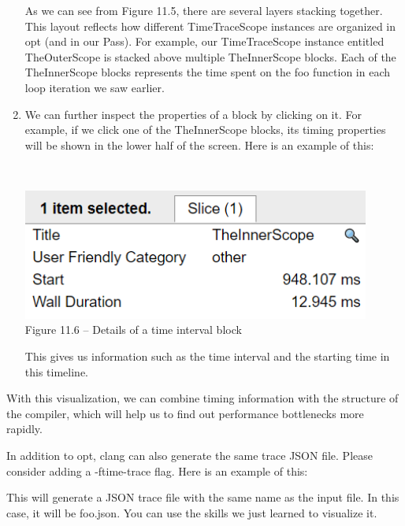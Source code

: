 \begin{enumerate}
As we can see from Figure 11.5, there are several layers stacking together. This layout reflects how different TimeTraceScope instances are organized in opt (and in our Pass). For example, our TimeTraceScope instance entitled TheOuterScope is stacked above multiple TheInnerScope blocks. Each of the TheInnerScope blocks represents the time spent on the foo function in each loop iteration we saw earlier.

\item We can further inspect the properties of a block by clicking on it. For example, if we click one of the TheInnerScope blocks, its timing properties will be shown in the lower half of the screen. Here is an example of this:

\hspace*{\fill} \\ %
\begin{center}
\includegraphics[width=0.9\textwidth]{content/3/chapter11/images/6.png}\\
Figure 11.6 – Details of a time interval block
\end{center}

This gives us information such as the time interval and the starting time in this timeline.

\end{enumerate}

With this visualization, we can combine timing information with the structure of the compiler, which will help us to find out performance bottlenecks more rapidly. 

In addition to opt, clang can also generate the same trace JSON file. Please consider adding a -ftime-trace flag. Here is an example of this:


This will generate a JSON trace file with the same name as the input file. In this case, it will be foo.json. You can use the skills we just learned to visualize it.

